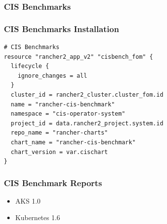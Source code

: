 \subsubsection{CIS Benchmarks}

\subsubsection{CIS Benchmarks Installation}

\begin{lstlisting}[caption=Installing CIS, frame=single, basicstyle=\ttfamily]
# CIS Benchmarks
resource "rancher2_app_v2" "cisbench_fom" {
  lifecycle {
    ignore_changes = all
  }
  cluster_id = rancher2_cluster.cluster_fom.id
  name = "rancher-cis-benchmark"
  namespace = "cis-operator-system"
  project_id = data.rancher2_project.system.id
  repo_name = "rancher-charts"
  chart_name = "rancher-cis-benchmark"
  chart_version = var.cischart
}

\end{lstlisting}

\subsubsection{CIS Benchmark Reports}

\begin{itemize}
 \item AKS 1.0
 \item Kubernetes 1.6
\end{itemize}
